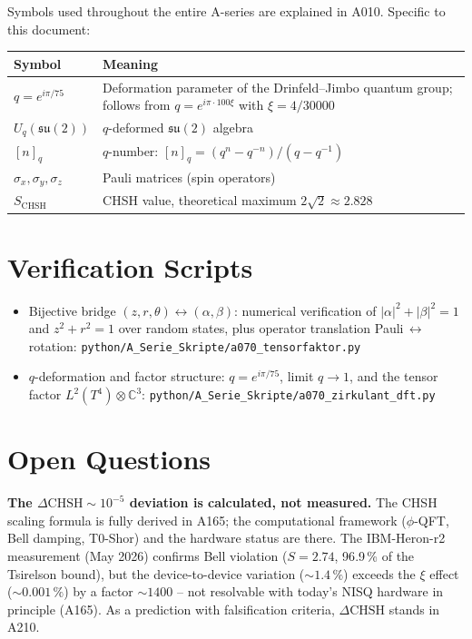 Symbols used throughout the entire A-series are explained in A010.
Specific to this document:

\begin{center}
\renewcommand{\arraystretch}{1.3}
{\small\begin{tabular}{lp{9cm}}
\toprule
Symbol & Meaning \\
\midrule
$q = e^{i\pi/75}$ & Deformation parameter of the Drinfeld--Jimbo quantum group;
  follows from $q = e^{i\pi\cdot100\xi}$ with $\xi=4/30000$ \\
$U_q(\mathfrak{su}(2))$ & $q$-deformed $\mathfrak{su}(2)$ algebra \\
$[n]_q$ & $q$-number: $[n]_q = (q^n-q^{-n})/(q-q^{-1})$ \\
$\sigma_x,\sigma_y,\sigma_z$ & Pauli matrices (spin operators) \\
$S_\text{CHSH}$ & CHSH value, theoretical maximum $2\sqrt2\approx2{.}828$ \\
\bottomrule
\end{tabular}}
\renewcommand{\arraystretch}{1.0}
\end{center}

\section{Verification Scripts}

\begin{itemize}[leftmargin=2em,itemsep=2pt,topsep=2pt]
  \item Bijective bridge $(z,r,\theta)\leftrightarrow(\alpha,\beta)$: numerical
    verification of $|\alpha|^2+|\beta|^2=1$ and $z^2+r^2=1$ over random states,
    plus operator translation Pauli$\,\leftrightarrow\,$rotation:
    \texttt{python/A\_Serie\_Skripte/a070\_tensorfaktor.py}
  \item $q$-deformation and factor structure: $q = e^{i\pi/75}$, limit $q\to1$,
    and the tensor factor $L^2(T^4)\otimes\mathbb{C}^3$:
    \texttt{python/A\_Serie\_Skripte/a070\_zirkulant\_dft.py}
\end{itemize}

\section{Open Questions}

\textbf{The $\Delta\text{CHSH}\sim10^{-5}$ deviation is calculated, not measured.}
The CHSH scaling formula is fully derived in A165; the computational framework
($\phi$-QFT, Bell damping, T0-Shor) and the hardware status are there. The
IBM-Heron-r2 measurement (May 2026) confirms Bell violation ($S=2{.}74$, 96{.}9\,\%
of the Tsirelson bound), but the device-to-device variation ($\sim1{.}4\,\%$)
exceeds the $\xi$ effect ($\sim0{.}001\,\%$) by a factor $\sim1400$ -- not
resolvable with today's NISQ hardware in principle (A165). As a prediction with
falsification criteria, $\Delta\text{CHSH}$ stands in A210.

